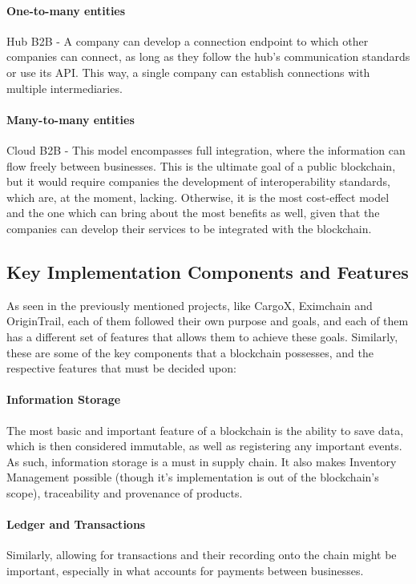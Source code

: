 \paragraph{One-to-many entities} Hub B2B - A company can develop a connection endpoint to which other companies can connect, as long as they follow the hub's communication standards or use its API. This way, a  single company can establish connections with multiple intermediaries.

\paragraph{Many-to-many entities} Cloud B2B - This model encompasses full integration, where the information can flow freely between businesses. This is the ultimate goal of a public blockchain, but it would require companies the development of interoperability standards, which are, at the moment, lacking. Otherwise, it is the most cost-effect model and the one which can bring about the most benefits as well, given that the companies can develop their services to be integrated with the blockchain.

\subsection{Key Implementation Components and Features}
As seen in the previously mentioned projects, like CargoX, Eximchain and OriginTrail, each of them followed their own purpose and goals, and each of them has a different set of features that allows them to achieve these goals. Similarly, these are some of the key components that a blockchain possesses, and the respective features that must be decided upon:

\paragraph{Information Storage}
The most basic and important feature of a blockchain is the ability to save data, which is then considered immutable, as well as registering any important events. As such, information storage is a must in supply chain.  It also makes Inventory Management possible (though it's  implementation is out of the blockchain's scope), traceability and provenance of products.
      
\paragraph{Ledger and Transactions}
Similarly, allowing for transactions and their recording onto the chain might be important, especially in what accounts for payments between businesses.
  
